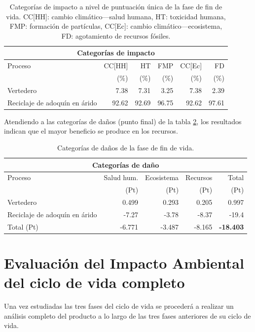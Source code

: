 \begin{table}[!htb]
\centering
\begin{tabular}{p{4cm}rrrrr}
\toprule
\multicolumn{6}{c}{Categorías de impacto}\\
\midrule
Proceso & CC[HH] & HT & FMP & CC[Ec] & FD\\
 &  (\%) & (\%) & (\%) & (\%) & (\%)\\
\midrule
Vertedero & 7.38 & 7.31 & 3.25 & 7.38 & 2.39\\
Reciclaje de adoquín en árido & 92.62 & 92.69 & 96.75 & 92.62 & 97.61\\
\bottomrule
\end{tabular}
\caption[Categorías de impacto a nivel de puntuación única de la fase de fin de vida.]{Categorías de impacto a nivel de puntuación única de la fase de fin de vida. CC[HH]: cambio climático—salud humana, HT: toxicidad humana, FMP: formación de partículas, CC[Ec]: cambio climático—ecosistema, FD: agotamiento de recursos fósiles.}
\label{categoriasimpactofdvpuntunica}
\end{table}

Atendiendo a las categorías de daños (punto final) de la tabla \ref{categoriasdanosfdv}, los resultados indican que el mayor beneficio se produce en los recursos.

\begin{table}[!htb]
\centering
\begin{tabular}{p{6cm}rrrr}
\toprule
\multicolumn{5}{c}{Categorías de daño}\\
\midrule
Proceso & Salud hum. & Ecosistema & Recursos & Total\\
 & (Pt) & (Pt) & (Pt) & (Pt)\\
\midrule
Vertedero & 0.499 & 0.293 & 0.205 & 0.997\\
Reciclaje de adoquín en árido & -7.27 & -3.78 & -8.37 & -19.4\\
\midrule
Total (Pt) & -6.771 & -3.487 & -8.165 & \textbf{-18.403}\\
\bottomrule
\end{tabular}
\caption{Categorías de daños de la fase de fin de vida.}
\label{categoriasdanosfdv}
\end{table}

\section{Evaluación del Impacto Ambiental del ciclo de vida completo}

Una vez estudiadas las tres fases del ciclo de vida se procederá a realizar un análisis completo del producto a lo largo de las tres fases anteriores de su ciclo de vida.

